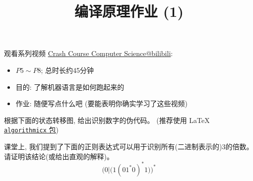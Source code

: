 \documentclass[a4paper, justified]{tufte-handout}
\title{编译原理作业 (1)}
\date{\zhtoday} %
\begin{document}
\maketitle
\noplagiarism %
\begin{abstract}
\end{abstract}
\beginrequired
\begin{problem}
  观看系列视频 \href{https://www.bilibili.com/video/BV1EW411u7th?}{Crash Course Computer Science@bilibili}:
  \begin{itemize}
    \item $P5 \sim P8$; 总时长约45分钟
    \item 目的: 了解机器语言是如何跑起来的
    \item 作业: 随便写点什么吧 (要能表明你确实学习了这些视频)
  \end{itemize}
\end{problem}

\begin{solution}
\end{solution}

\begin{problem}[手写词法分析器]
  根据下面的状态转移图, 给出识别数字的伪代码。
  (推荐使用 \LaTeX{} 
  \href{http://tug.ctan.org/macros/latex/contrib/algorithmicx/algorithmicx.pdf}{\texttt{algorithmicx} 包})

\end{problem}

\begin{solution}
\end{solution}

\begin{problem}[正则表达式]
  课堂上, 我们提到了下面的正则表达式可以用于识别所有(二进制表示的)3的倍数。
  请证明该结论(或给出直观的解释)。
  \[ 
    \Big(0|\big(1(01^{\ast}0)^{\ast}1\big)\Big)^{\ast} 
  \]
\end{problem}
\end{document}
